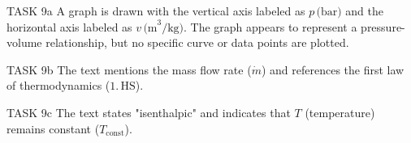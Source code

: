 TASK 9a  
A graph is drawn with the vertical axis labeled as \( p \, \text{(bar)} \) and the horizontal axis labeled as \( v \, \text{(m}^3/\text{kg)} \). The graph appears to represent a pressure-volume relationship, but no specific curve or data points are plotted.

TASK 9b  
The text mentions the mass flow rate (\( \dot{m} \)) and references the first law of thermodynamics (\( 1. \, \text{HS} \)).

TASK 9c  
The text states "isenthalpic" and indicates that \( T \) (temperature) remains constant (\( T_{\text{const}} \)).